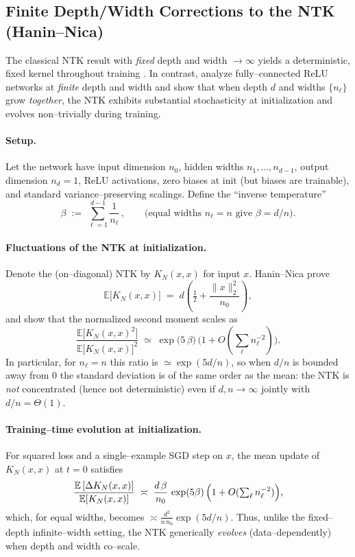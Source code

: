 \subsection{Finite Depth/Width Corrections to the NTK (Hanin--Nica)}\label{subsec:finite-dw-ntk}

The classical NTK result with \emph{fixed} depth and width $\to\infty$ yields a deterministic, fixed kernel throughout training \citep{jacot2018ntk,lee2020wide}. In contrast, \citet{haninNica2019finite} analyze fully--connected ReLU networks at \emph{finite} depth and width and show that when depth $d$ and widths $\{n_\ell\}$ grow \emph{together}, the NTK exhibits substantial stochasticity at initialization and evolves non--trivially during training.

\paragraph{Setup.}
Let the network have input dimension $n_0$, hidden widths $n_1,\dots,n_{d-1}$, output dimension $n_d=1$, ReLU activations, zero biases at init (but biases are trainable), and standard variance--preserving scalings. Define the ``inverse temperature''
\[
	\beta \;:=\; \sum_{\ell=1}^{d-1} \frac{1}{n_\ell}\,,\qquad\text{(equal widths $n_\ell=n$ give $\beta=d/n$).}
\]

\paragraph{Fluctuations of the NTK at initialization.}
Denote the (on--diagonal) NTK by $K_N(x,x)$ for input $x$. Hanin--Nica prove
\[
	\mathbb{E}\!\big[K_N(x,x)\big] \;=\; d\!\left(\tfrac12 + \frac{\|x\|_2^2}{n_0}\right),
\]
and show that the normalized second moment scales as
\[
	\frac{\mathbb{E}\!\big[K_N(x,x)^2\big]}{\mathbb{E}\!\big[K_N(x,x)\big]^2}
	\;\simeq\; \exp\!\big(5\,\beta\big)\,\bigl(1 + O(\textstyle\sum_\ell n_\ell^{-2})\bigr).
\]
In particular, for $n_\ell=n$ this ratio is $\simeq \exp(5d/n)$, so when $d/n$ is bounded away from $0$ the standard deviation is of the same order as the mean: the NTK is \emph{not} concentrated (hence not deterministic) even if $d,n\to\infty$ jointly with $d/n=\Theta(1)$.

\paragraph{Training--time evolution at initialization.}
For squared loss and a single--example SGD step on $x$, the mean update of $K_N(x,x)$ at $t=0$ satisfies
\[
	\frac{\mathbb{E}\,[\Delta K_N(x,x)]}{\mathbb{E}[K_N(x,x)]}
	\;\asymp\; \frac{d\,\beta}{n_0}\,\exp(5\beta)\,\Bigl(1+O(\textstyle\sum_\ell n_\ell^{-2})\Bigr),
\]
which, for equal widths, becomes $\asymp \tfrac{d^2}{n\,n_0}\exp(5d/n)$. Thus, unlike the fixed--depth infinite--width setting, the NTK generically \emph{evolves} (data--dependently) when depth and width co--scale.

